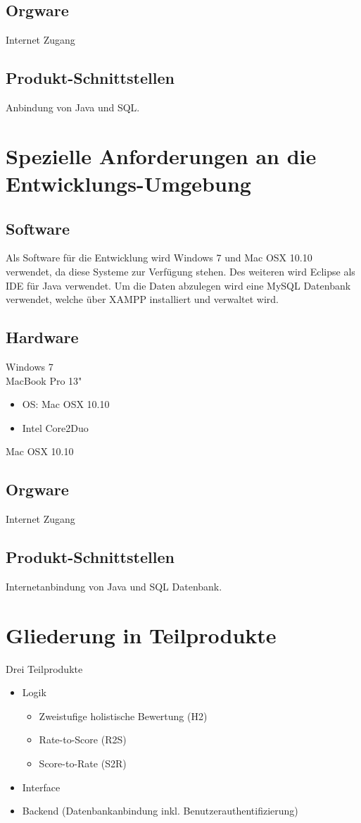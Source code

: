 \documentclass[a4paper,listof=leveldown,listof=numbered]{scrreprt}
\begin{document}
	\section{Orgware}
	Internet Zugang
	
	\section{Produkt-Schnittstellen}
	Anbindung von Java und SQL.
	
\chapter{Spezielle Anforderungen an die Entwicklungs-Umgebung}
	
	\section{Software}
	Als Software für die Entwicklung wird Windows 7 und Mac OSX 10.10 verwendet, da diese Systeme zur Verfügung stehen. Des weiteren wird Eclipse als IDE für Java verwendet. Um die Daten abzulegen wird eine MySQL Datenbank verwendet, welche über XAMPP installiert und verwaltet wird.
	\section{Hardware}
	Windows 7\\
	
	MacBook Pro 13"
	\begin{itemize}
		\item OS: Mac OSX 10.10
		\item Intel Core2Duo
	\end{itemize}
	Mac OSX 10.10
	
	\section{Orgware}
	Internet Zugang
	
	\section{Produkt-Schnittstellen}
	Internetanbindung von Java und SQL Datenbank.

	
\chapter{Gliederung in Teilprodukte}
	Drei Teilprodukte
	\begin{itemize}
		\item Logik 
			\begin{itemize}
				\item Zweistufige holistische Bewertung (H2)
				\item Rate-to-Score (R2S)
				\item Score-to-Rate (S2R)
			\end{itemize}
		\item Interface
		\item Backend (Datenbankanbindung inkl. Benutzerauthentifizierung)
	\end{itemize}
\end{document}
